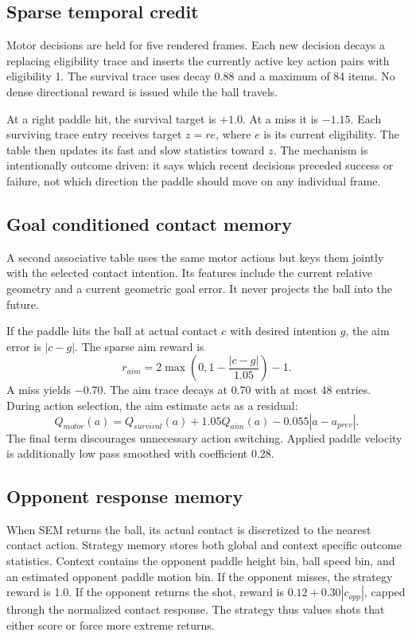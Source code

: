 \documentclass[10pt,twocolumn]{article}
\begin{document}
\subsection{Sparse temporal credit}
Motor decisions are held for five rendered frames. Each new decision decays a replacing eligibility trace and inserts the currently active key action pairs with eligibility 1. The survival trace uses decay 0.88 and a maximum of 84 items. No dense directional reward is issued while the ball travels.

At a right paddle hit, the survival target is $+1.0$. At a miss it is $-1.15$. Each surviving trace entry receives target $z=r e$, where $e$ is its current eligibility. The table then updates its fast and slow statistics toward $z$. The mechanism is intentionally outcome driven: it says which recent decisions preceded success or failure, not which direction the paddle should move on any individual frame.

\subsection{Goal conditioned contact memory}
A second associative table uses the same motor actions but keys them jointly with the selected contact intention. Its features include the current relative geometry and a current geometric goal error. It never projects the ball into the future.

If the paddle hits the ball at actual contact $c$ with desired intention $g$, the aim error is $|c-g|$. The sparse aim reward is
\begin{equation}
r_{aim}=2\max\left(0,1-\frac{|c-g|}{1.05}\right)-1.
\end{equation}
A miss yields $-0.70$. The aim trace decays at 0.70 with at most 48 entries. During action selection, the aim estimate acts as a residual:
\begin{equation}
Q_{motor}(a)=Q_{survival}(a)+1.05Q_{aim}(a)-0.055|a-a_{prev}|.
\end{equation}
The final term discourages unnecessary action switching. Applied paddle velocity is additionally low pass smoothed with coefficient 0.28.

\subsection{Opponent response memory}
When SEM returns the ball, its actual contact is discretized to the nearest contact action. Strategy memory stores both global and context specific outcome statistics. Context contains the opponent paddle height bin, ball speed bin, and an estimated opponent paddle motion bin. If the opponent misses, the strategy reward is 1.0. If the opponent returns the shot, reward is $0.12+0.30|c_{opp}|$, capped through the normalized contact response. The strategy thus values shots that either score or force more extreme returns.
\end{document}
